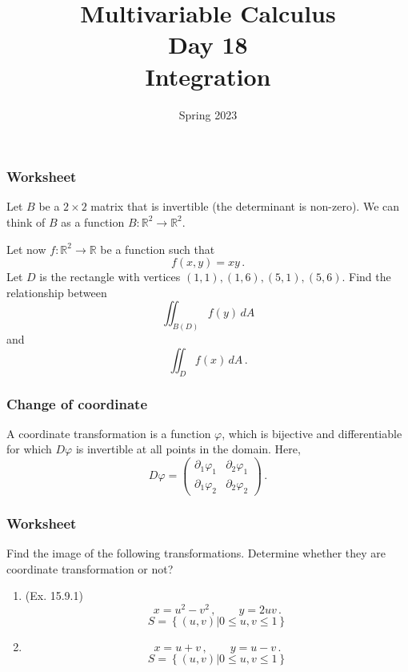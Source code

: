 \documentclass[aspectratio=169]{beamer}
\title{ Multivariable Calculus \\ Day  18\\ Integration }
\date{Spring 2023}
\newcommand{\R}{\mathbb{R}}
\begin{document}
\maketitle

\begin{frame}
    \frametitle{Worksheet}
         Let $B$ be a $2\times 2$ matrix that is invertible (the determinant is non-zero).
        We can think of $B$ as a function $B: \R^2 \to \R^2$.

        Let now $f:\R^2 \to \R$ be a function such that
        \begin{equation*}
            f(x,y) = xy \,.
        \end{equation*}
        Let $D$ is the rectangle with vertices $(1,1), (1,6), (5,1), (5,6)$.
    Find the relationship between
    \begin{equation*}
        \iint_{B(D)} f(y) \, dA 
    \end{equation*}
    and
    \begin{equation*}
        \iint_D f(x) \, dA \,.
    \end{equation*}
\end{frame}


\begin{frame}
    \frametitle{Change of coordinate}
A coordinate transformation is a function \(\varphi\), which
is bijective and differentiable for which \(D\varphi\) is
invertible at all points in the domain.
Here,
\begin{equation*}
    D\varphi = 
    \begin{pmatrix}
        \partial_1 \varphi_1 & \partial_2 \varphi_1 \\
        \partial_1 \varphi_2 & \partial_2 \varphi_2 
    \end{pmatrix} \,.
\end{equation*}
\end{frame}

\begin{frame}
    \frametitle{Worksheet}
    Find the image of the following transformations.
    Determine whether they are coordinate transformation or not?
    \begin{enumerate}
        \item (Ex. 15.9.1) 
    \begin{equation*}
        x = u^2 - v^2 \,, \qquad y = 2uv \,.
    \end{equation*}
    \begin{equation*}
        S =  \left\{ (u,v) | 0 \leq u,v \leq 1   \right\}
    \end{equation*}
    \item 
        \begin{equation*}
            x = u + v \,, \qquad y = u -v \,.
        \end{equation*}
    \begin{equation*}
        S =  \left\{ (u,v) | 0 \leq u,v \leq 1   \right\}
    \end{equation*}
    \end{enumerate}
\end{frame}
\end{document}
